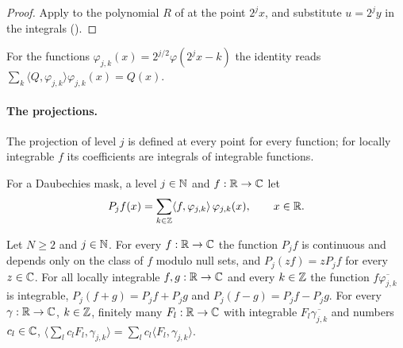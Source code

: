 \begin{proof}
\leanok
{}
Apply  to the polynomial $R$ of
 at the point $2^j x$, and substitute $u = 2^j y$ in the
integrals ().
\end{proof}

For the functions $\varphi_{j,k}(x) = 2^{j/2} \varphi(2^j x - k)$ the identity reads
$\sum_k \langle Q, \varphi_{j,k} \rangle \varphi_{j,k}(x) = Q(x)$.

\paragraph{The projections.}
The projection of level $j$ is defined at every point for every function; for locally
integrable $f$ its coefficients are integrals of integrable functions.

\begin{definition}
\label{def:daub-proj-fun}
\leanok
{}
For a Daubechies mask, a level $j \in \mathbb{N}$ and $f : \mathbb{R} \to \mathbb{C}$ let
\[
  P_j f(x) = \sum_{k \in \mathbb{Z}} \langle f, \varphi_{j,k} \rangle \, \varphi_{j,k}(x) ,
  \qquad x \in \mathbb{R} .
\]
\end{definition}

\begin{lemma}
\label{lem:daub-proj-fun-basic}
\leanok
{}
Let $N \geq 2$ and $j \in \mathbb{N}$. For every $f : \mathbb{R} \to \mathbb{C}$ the function $P_j f$ is continuous and
depends only on the class of $f$ modulo null sets, and $P_j(z f) = z P_j f$ for every $z \in \mathbb{C}$.
For all locally integrable $f, g : \mathbb{R} \to \mathbb{C}$ and every $k \in \mathbb{Z}$ the function
$f \overline{\varphi_{j,k}}$ is integrable, $P_j(f + g) = P_j f + P_j g$ and
$P_j(f - g) = P_j f - P_j g$. For every $\gamma : \mathbb{R} \to \mathbb{C}$, $k \in \mathbb{Z}$, finitely many
$F_l : \mathbb{R} \to \mathbb{C}$ with integrable $F_l \overline{\gamma_{j,k}}$ and numbers $c_l \in \mathbb{C}$,
$\langle \sum_l c_l F_l, \gamma_{j,k} \rangle = \sum_l c_l \langle F_l, \gamma_{j,k} \rangle$.
\end{lemma}

